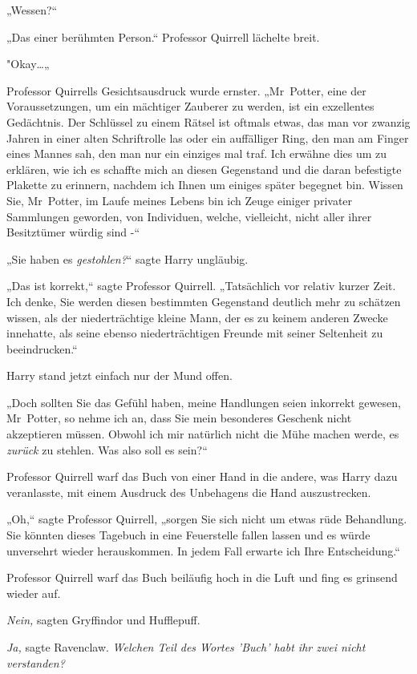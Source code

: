 {„Wessen?“

„Das einer berühmten Person.“ Professor Quirrell lächelte breit.

"Okay…„

Professor Quirrells Gesichtsausdruck wurde ernster. „Mr~Potter, eine der Voraussetzungen, um ein mächtiger Zauberer zu werden, ist ein exzellentes Gedächtnis. Der Schlüssel zu einem Rätsel ist oftmals etwas, das man vor zwanzig Jahren in einer alten Schriftrolle las oder ein auffälliger Ring, den man am Finger eines Mannes sah, den man nur ein einziges mal traf. Ich erwähne dies um zu erklären, wie ich es schaffte mich an diesen Gegenstand und die daran befestigte Plakette zu erinnern, nachdem ich Ihnen um einiges später begegnet bin. Wissen Sie, Mr~Potter, im Laufe meines Lebens bin ich Zeuge einiger privater Sammlungen geworden, von Individuen, welche, vielleicht, nicht aller ihrer Besitztümer würdig sind -“

„Sie haben es \emph{gestohlen?}“ sagte Harry ungläubig.

„Das ist korrekt,“ sagte Professor Quirrell. „Tatsächlich vor relativ kurzer Zeit. Ich denke, Sie werden diesen bestimmten Gegenstand deutlich mehr zu schätzen wissen, als der niederträchtige kleine Mann, der es zu keinem anderen Zwecke innehatte, als seine ebenso niederträchtigen Freunde mit seiner Seltenheit zu beeindrucken.“

Harry stand jetzt einfach nur der Mund offen.

„Doch sollten Sie das Gefühl haben, meine Handlungen seien inkorrekt gewesen, Mr~Potter, so nehme ich an, dass Sie mein besonderes Geschenk nicht akzeptieren müssen. Obwohl ich mir natürlich nicht die Mühe machen werde, es \emph{zurück} zu stehlen. Was also soll es sein?“

Professor Quirrell warf das Buch von einer Hand in die andere, was Harry dazu veranlasste, mit einem Ausdruck des Unbehagens die Hand auszustrecken.

„Oh,“ sagte Professor Quirrell, „sorgen Sie sich nicht um etwas rüde Behandlung. Sie könnten dieses Tagebuch in eine Feuerstelle fallen lassen und es würde unversehrt wieder herauskommen. In jedem Fall erwarte ich Ihre Entscheidung.“

Professor Quirrell warf das Buch beiläufig hoch in die Luft und fing es grinsend wieder auf.

\emph{Nein,} sagten Gryffindor und Hufflepuff.

\emph{Ja,} sagte Ravenclaw. \emph{Welchen Teil des Wortes 'Buch' habt ihr zwei nicht} \emph{verstanden?}

}
